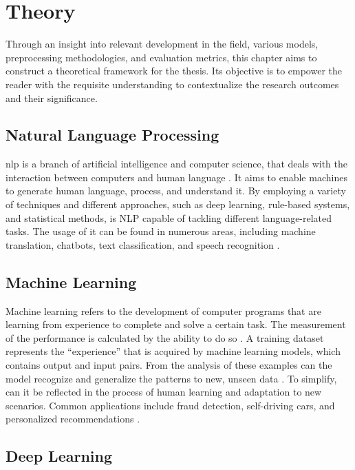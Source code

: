 \chapter{Theory}

Through an insight into relevant development in the field, various models, preprocessing methodologies, and evaluation metrics, this chapter aims to construct a theoretical framework for the thesis. Its objective is to empower the reader with the requisite understanding to contextualize the research outcomes and their significance.

\section{Natural Language Processing}

\acf{nlp} is a branch of artificial intelligence and computer science, that deals with the interaction between computers and human language \citep{helland_tackling_2023}. It aims to enable machines to generate human language, process, and understand it. By employing a variety of techniques and different approaches, such as deep learning, rule-based systems, and statistical methods, is NLP capable of tackling different language-related tasks. The usage of it can be found in numerous areas, including machine translation, chatbots, text classification, and speech recognition \citep{helland_tackling_2023}.

\section{Machine Learning}

Machine learning refers to the development of computer programs that are learning from experience to complete and solve a certain task. The measurement of the performance is calculated by the ability to do so \citep{helland_tackling_2023}. A training dataset represents the “experience” that is acquired by machine learning models, which contains output and input pairs. From the analysis of these examples can the model recognize and generalize the patterns to new, unseen data \citep{helland_tackling_2023}. To simplify, can it be reflected in the process of human learning and adaptation to new scenarios. Common applications include fraud detection, self-driving cars, and personalized recommendations \citep{helland_tackling_2023}.

\section{Deep Learning}

